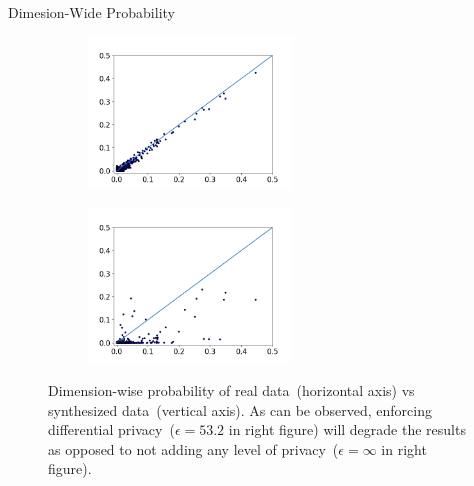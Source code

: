 \documentclass{beamer}
\begin{document}
\begin{frame}{Dimesion-Wide Probability}

\begin{figure}[t!]
    \centering
    \begin{subfigure}[t]{0.4\textwidth}
        \centering
        \includegraphics[height=1.6in]{_img/einf.png}
    \end{subfigure}
    \begin{subfigure}[t]{0.4\textwidth}
        \centering
        \includegraphics[height=1.6in]{_img/e53.png}
    \end{subfigure}
    \caption{Dimension-wise probability of real data~(horizontal axis) vs synthesized data~(vertical axis). As can be observed, enforcing differential privacy~($\epsilon=53.2$ in right figure) will degrade the results as opposed to not adding any level of privacy~($\epsilon=\infty$ in right figure).}
\end{figure}

    
\end{frame}
\end{document}
